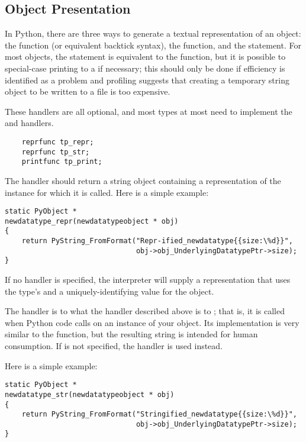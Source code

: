 \subsection{Object Presentation}

In Python, there are three ways to generate a textual representation
of an object: the  function (or
equivalent backtick syntax), the 
function, and the  statement.  For most objects, the
 statement is equivalent to the 
function, but it is possible to special-case printing to a
 if necessary; this should only be done if efficiency is
identified as a problem and profiling suggests that creating a
temporary string object to be written to a file is too expensive.

These handlers are all optional, and most types at most need to
implement the  and  handlers.

\begin{verbatim}
    reprfunc tp_repr;
    reprfunc tp_str;
    printfunc tp_print;
\end{verbatim}

The  handler should return a string object containing
a representation of the instance for which it is called.  Here is a
simple example:

\begin{verbatim}
static PyObject *
newdatatype_repr(newdatatypeobject * obj)
{
    return PyString_FromFormat("Repr-ified_newdatatype{{size:\%d}}",
                               obj->obj_UnderlyingDatatypePtr->size);
}
\end{verbatim}

If no  handler is specified, the interpreter will
supply a representation that uses the type's  and a
uniquely-identifying value for the object.

The  handler is to  what the
 handler described above is to ; that
is, it is called when Python code calls  on an
instance of your object.  Its implementation is very similar to the
 function, but the resulting string is intended for
human consumption.  If  is not specified, the
 handler is used instead.

Here is a simple example:

\begin{verbatim}
static PyObject *
newdatatype_str(newdatatypeobject * obj)
{
    return PyString_FromFormat("Stringified_newdatatype{{size:\%d}}",
                               obj->obj_UnderlyingDatatypePtr->size);
}
\end{verbatim}

